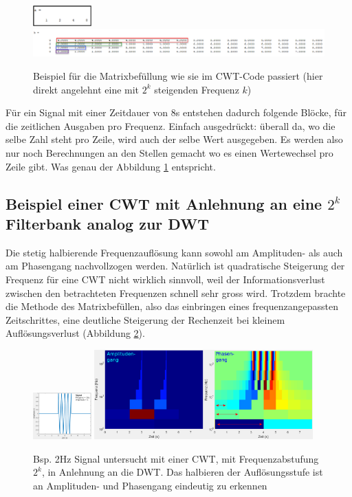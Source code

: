 \begin{figure}
	\centering
	\includegraphics[width=0.2\textwidth]{papers/wavelets/images/17-1_a-Array.png}
	\includegraphics[width=\textwidth]{papers/wavelets/images/17-2_BspFillUp.png}
	\caption{Beispiel für die Matrixbefüllung wie sie im CWT-Code passiert (hier direkt angelehnt eine mit $2^k$ steigenden Frequenz $k$)}
	\label{wavelet:fig:BspFillUp}
\end{figure}

Für ein Signal mit einer Zeitdauer von 8s entstehen dadurch folgende Blöcke, für die zeitlichen Ausgaben pro Frequenz. Einfach ausgedrückt: 
überall da, wo die selbe Zahl steht pro Zeile, wird auch der selbe Wert ausgegeben. Es werden also nur noch Berechnungen an den Stellen gemacht wo es einen Wertewechsel pro Zeile gibt. Was genau der Abbildung \ref{wavelet:fig:BspFillUp} entspricht.

\subsection{Beispiel einer CWT mit Anlehnung an eine $2^k$ Filterbank analog zur DWT
	\label{wavelets:subsection:Radix2CWT}}
Die stetig halbierende Frequenzauflösung kann sowohl am Amplituden- als auch am Phasengang nachvollzogen werden. Natürlich ist quadratische Steigerung der Frequenz für eine CWT nicht wirklich sinnvoll, weil der Informationsverlust zwischen den betrachteten Frequenzen schnell sehr gross wird. Trotzdem brachte die Methode des Matrixbefüllen, also das einbringen eines frequenzangepassten Zeitschrittes, eine deutliche Steigerung der Rechenzeit bei kleinem Auflösungsverlust (Abbildung \ref{wavelet:fig:FilterbankAnwendung}).

\begin{figure}
	\centering
	\includegraphics[width=0.2\textwidth]{papers/wavelets/images/17-3_AnwCwtFilterbankSig.png}
	\includegraphics[width=0.75\textwidth]{papers/wavelets/images/17-3_CWT-FilterbankStyle.png}
	\caption{Bsp. 2Hz Signal untersucht mit einer CWT, mit Frequenzabstufung $2^k$, in Anlehnung an die DWT. Das halbieren der Auflösungsstufe ist an Amplituden- und Phasengang eindeutig zu erkennen}
	\label{wavelet:fig:FilterbankAnwendung}
\end{figure}

